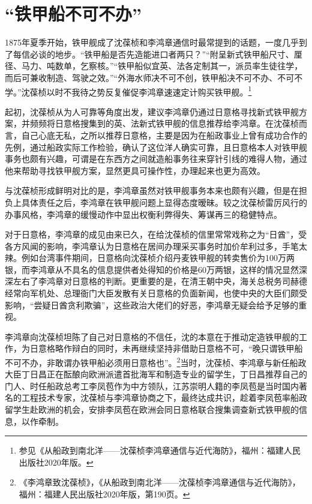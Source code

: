 \documentclass[12pt,UTF8]{ctexbook}
\begin{document}
\section{“铁甲船不可不办”}

1875年夏季开始，铁甲舰成了沈葆桢和李鸿章通信时最常提到的话题，一度几乎到了每信必谈的地步。“铁甲船是否先造能进口者两只？”“附呈新式铁甲船尺寸、厘径、马力、吨数单，乞察核。”“铁甲船似宜英、法各定制其一，派员率生徒往学，而后可兼收制造、驾驶之效。”“外海水师决不可不创，铁甲船决不可不办、不可不学。”沈葆桢以时不我待之势反复催促李鸿章速速定计购买铁甲舰。\footnote{参见《从船政到南北洋——沈葆桢李鸿章通信与近代海防》，福州：福建人民出版社2020年版。}

起初，沈葆桢从为人可靠等角度出发，建议李鸿章仍通过日意格寻找新式铁甲舰方案，并频频将日意格搜集到的英、法新式铁甲舰的信息推荐给李鸿章。在沈葆桢而言，自己心底无私，之所以推荐日意格，主要是因为在船政事业上曾有成功合作的先例，通过船政实际工作检验，确认了这位洋人确实可靠，且日意格本人对铁甲舰事务也颇有兴趣，可谓是在东西方之间就造船事务往来穿针引线的难得人物，通过他来帮助寻找铁甲舰方案，显然更具可操作性，办理起来也更为高效。

与沈葆桢形成鲜明对比的是，李鸿章虽然对铁甲舰事务本来也颇有兴趣，但是在担负上具体责任之后，李鸿章在铁甲舰问题上显得态度暧昧。较之沈葆桢雷厉风行的办事风格，李鸿章的缓慢动作中显出权衡利弊得失、筹谋再三的稳健特点。

对于日意格，李鸿章的成见由来已久，在给沈葆桢的信里常常戏称之为“日酋”，受各方风闻的影响，李鸿章认为日意格在居间办理采买事务时加价牟利过多，手笔太辣。例如台湾事件期间，日意格向沈葆桢介绍丹麦铁甲舰的转卖售价为100万两银，而李鸿章从不具名的信息提供者处得知的价格是60万两银，这样的情况显然深深左右了李鸿章对日意格的判断。更重要的是，在清王朝中央，海关总税务司赫德经常向军机处、总理衙门大臣发散有关日意格的负面新闻，也使中央的大臣们颇受影响，“尝疑日酋贪利欺骗”，这些政治大佬们的好恶，李鸿章无疑会给予足够的重视。

李鸿章向沈葆桢坦陈了自己对日意格的不信任，沈的本意在于推动定造铁甲舰的工作，为日意格略作辩白的同时，未再继续坚持非借助日意格不可，“晚只谓铁甲船不可不办，非敢谓办铁甲船必须用日意格也”。\footnote{《李鸿章致沈葆桢》，《从船政到南北洋——沈葆桢李鸿章通信与近代海防》，福州：福建人民出版社2020年版，第190页。}当时，沈葆桢、李鸿章与新任船政大臣丁日昌正在酝酿向欧洲派遣首批海军和制造专业的留学生，丁日昌推荐自己的门人、时任船政总考工李凤苞作为中方领队，江苏崇明人籍的李凤苞是当时国内著名的工程技术专家，沈葆桢与李鸿章协商之下，最终达成共识，趁着李凤苞率船政留学生赴欧洲的机会，安排李凤苞在欧洲会同日意格联合搜集调查新式铁甲舰的信息，以作牵制。
\end{document}

